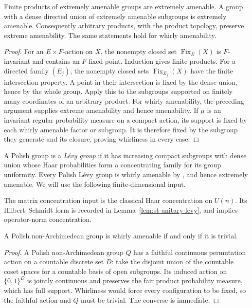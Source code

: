 \begin{lemma}\label{lem:st-products}
 Finite products of extremely amenable groups are
extremely amenable. A group with a dense directed union of extremely
amenable subgroups is extremely amenable. Consequently arbitrary products,
with the product topology, preserve extreme amenability.
The same statements hold for whirly amenability.
\end{lemma}

\begin{proof}
For an $E\times F$-action on $X$, the nonempty closed set $\operatorname{Fix}_E(X)$ is $F$-invariant and contains an $F$-fixed point. Induction gives finite products.
For a directed family $(E_j)$, the nonempty closed sets $\operatorname{Fix}_{E_j}(X)$ have
the finite intersection property. A point in their intersection is fixed by
the dense union, hence by the whole group. Apply this to the subgroups
supported on finitely many coordinates of an arbitrary product.
For whirly amenability, the preceding argument supplies extreme amenability
and hence amenability. If $\mu$ is an invariant regular probability measure
on a compact action, its support is fixed by each whirly amenable factor or
subgroup. It is therefore fixed by the subgroup they generate and its
closure, proving whirliness in every case.
\end{proof}

A Polish group is a \emph{L\'evy group} if it has increasing compact
subgroups with dense union whose Haar probabilities form a concentrating
family for its group uniformity. Every Polish L\'evy group is whirly
amenable by \cite[Theorem 1.1 and Remark 1.4]{GlasnerTsirelsonWeiss2005}, and hence extremely
amenable. We will use the following finite-dimensional input.

The matrix concentration input is the classical Haar concentration
on \(U(n)\). Its Hilbert--Schmidt form is recorded in
Lemma~\ref{lem:st-unitary-levy}, and implies operator-norm concentration.

\begin{lemma}\label{lem:st-nonarch-whirly}
 A Polish non-Archimedean group is whirly
amenable if and only if it is trivial.
\end{lemma}

\begin{proof}
A Polish non-Archimedean group $Q$ has a faithful continuous permutation
action on a countable discrete set $D$: take the disjoint union of the
countable coset spaces for a countable basis of open subgroups. Its induced
action on $\{0,1\}^D$ is jointly continuous and preserves the fair product
probability measure, which has full support. Whirliness would force every
configuration to be fixed, so the faithful action and $Q$ must be trivial.
The converse is immediate.
\end{proof}

